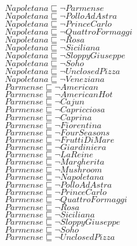 \documentclass[a4paper,10pt]{article}
\begin{document}
 $Napoletana \sqsubseteq  \lnot Parmense$\\ 
 $Napoletana \sqsubseteq  \lnot PolloAdAstra$\\ 
 $Napoletana \sqsubseteq  \lnot PrinceCarlo$\\ 
 $Napoletana \sqsubseteq  \lnot QuattroFormaggi$\\ 
 $Napoletana \sqsubseteq  \lnot Rosa$\\ 
 $Napoletana \sqsubseteq  \lnot Siciliana$\\ 
 $Napoletana \sqsubseteq  \lnot SloppyGiuseppe$\\ 
 $Napoletana \sqsubseteq  \lnot Soho$\\ 
 $Napoletana \sqsubseteq  \lnot UnclosedPizza$\\ 
 $Napoletana \sqsubseteq  \lnot Veneziana$\\ 
 $Parmense \sqsubseteq  \lnot American$\\ 
 $Parmense \sqsubseteq  \lnot AmericanHot$\\ 
 $Parmense \sqsubseteq  \lnot Cajun$\\ 
 $Parmense \sqsubseteq  \lnot Capricciosa$\\ 
 $Parmense \sqsubseteq  \lnot Caprina$\\ 
 $Parmense \sqsubseteq  \lnot Fiorentina$\\ 
 $Parmense \sqsubseteq  \lnot FourSeasons$\\ 
 $Parmense \sqsubseteq  \lnot FruttiDiMare$\\ 
 $Parmense \sqsubseteq  \lnot Giardiniera$\\ 
 $Parmense \sqsubseteq  \lnot LaReine$\\ 
 $Parmense \sqsubseteq  \lnot Margherita$\\ 
 $Parmense \sqsubseteq  \lnot Mushroom$\\ 
 $Parmense \sqsubseteq  \lnot Napoletana$\\ 
 $Parmense \sqsubseteq  \lnot PolloAdAstra$\\ 
 $Parmense \sqsubseteq  \lnot PrinceCarlo$\\ 
 $Parmense \sqsubseteq  \lnot QuattroFormaggi$\\ 
 $Parmense \sqsubseteq  \lnot Rosa$\\ 
 $Parmense \sqsubseteq  \lnot Siciliana$\\ 
 $Parmense \sqsubseteq  \lnot SloppyGiuseppe$\\ 
 $Parmense \sqsubseteq  \lnot Soho$\\ 
 $Parmense \sqsubseteq  \lnot UnclosedPizza$\\ 
\end{document}
